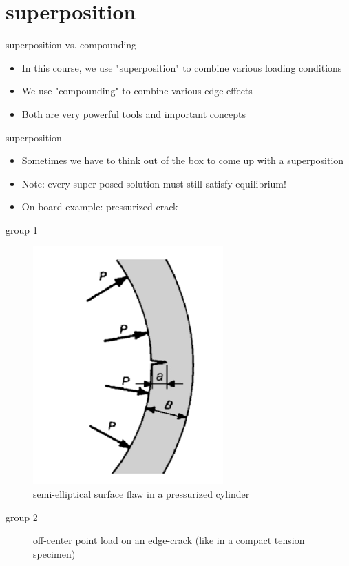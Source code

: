 \documentclass[10pt]{beamer}
\begin{document}
\section{superposition}

\begin{frame}{superposition vs. compounding}
	\begin{itemize}
		\item In this course, we use "superposition" to combine various loading conditions
		\item We use "compounding" to combine various edge effects
		\item Both are very powerful tools and important concepts
	\end{itemize}
\end{frame}

\begin{frame}{superposition}
	\begin{itemize}
		\item Sometimes we have to think out of the box to come up with a superposition
		\item Note: every super-posed solution must still satisfy equilibrium!
		\item On-board example: pressurized crack
	\end{itemize}
\end{frame}

\begin{frame}{group 1}
\begin{figure}
\centering
\includegraphics[width=0.3\linewidth]{group1}
\caption{semi-elliptical surface flaw in a pressurized cylinder}
\label{fig:group1}
\end{figure}
\end{frame}

\begin{frame}{group 2}
	\begin{figure}
		\centering
		\caption{off-center point load on an edge-crack (like in a compact tension specimen)}
	\end{figure}
\end{frame}
\end{document}
